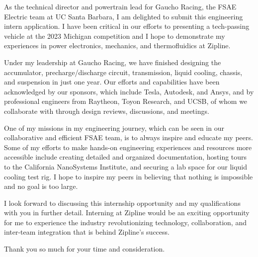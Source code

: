 \documentclass[11pt, letterpaper]{awesome-cv} %
\begin{document}
\makecvheader %

\makelettertitle %


\begin{cvletter}

As the technical director and powertrain lead for Gaucho Racing, the FSAE Electric team at UC Santa Barbara, I am delighted to submit this engineering intern application. I have been critical in our efforts to presenting a tech-passing vehicle at the 2023 Michigan competition and I hope to demonstrate my experiences in power electronics, mechanics, and thermofluidics at Zipline. 

Under my leadership at Gaucho Racing, we have finished designing the accumulator, precharge/discharge circuit, transmission, liquid cooling, chassis, and suspension in just one year. Our efforts and capabilities have been acknowledged by our sponsors, which include Tesla, Autodesk, and Ansys, and by professional engineers from Raytheon, Toyon Research, and UCSB, of whom we collaborate with through design reviews, discussions, and meetings. 

One of my missions in my engineering journey, which can be seen in our collaborative and efficient FSAE team, is to always inspire and educate my peers. Some of my efforts to make hands-on engineering experiences and resources more accessible include creating detailed and organized documentation, hosting tours to the California NanoSystems Institute, and securing a lab space for our liquid cooling test rig. I hope to inspire my peers in believing that nothing is impossible and no goal is too large.

I look forward to discussing this internship opportunity and my qualifications with you in further detail. Interning at Zipline would be an exciting opportunity for me to experience the industry revolutionizing technology, collaboration, and inter-team integration that is behind Zipline's success. 

Thank you so much for your time and consideration.



\end{cvletter}
\end{document}
